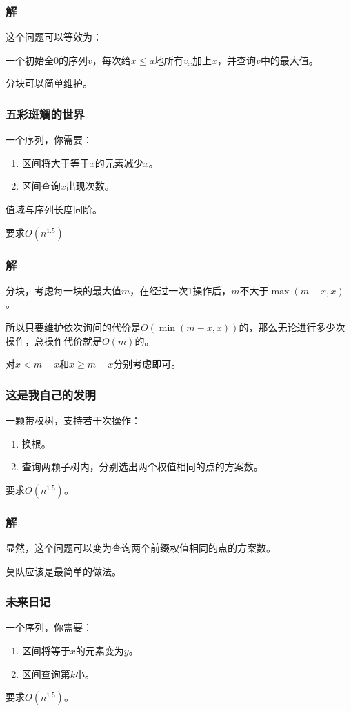 \documentclass[10pt]{beamer}
\begin{document}
	\begin{frame}
		\frametitle{解}
	
		这个问题可以等效为：

		一个初始全$0$的序列$v$，每次给$x\le a$地所有$v_x$加上$x$，并查询$v$中的最大值。

		分块可以简单维护。
	
	\end{frame}
	\begin{frame}
		\frametitle{五彩斑斓的世界}
	
		一个序列，你需要：

		\begin{enumerate}
			\item 区间将大于等于$x$的元素减少$x$。
			\item 区间查询$x$出现次数。
		\end{enumerate}

		值域与序列长度同阶。

		要求$O(n^{1.5})$
	
	\end{frame}
	\begin{frame}
		\frametitle{解}
	
		分块，考虑每一块的最大值$m$，在经过一次1操作后，$m$不大于$\max(m-x,x)$。
	
		所以只要维护依次询问的代价是$O(\min(m-x,x))$的，那么无论进行多少次操作，总操作代价就是$O(m)$的。

		对$x<m-x$和$x\ge m-x$分别考虑即可。

	\end{frame}
	\begin{frame}
		\frametitle{这是我自己的发明}
	
		一颗带权树，支持若干次操作：

		\begin{enumerate}
			\item 换根。
			\item 查询两颗子树内，分别选出两个权值相同的点的方案数。
		\end{enumerate}

		要求$O(n^{1.5})$。
	
	\end{frame}
	\begin{frame}
		\frametitle{解}
	
		显然，这个问题可以变为查询两个前缀权值相同的点的方案数。

		莫队应该是最简单的做法。
		
	\end{frame}
	\begin{frame}
		\frametitle{未来日记}
	
		一个序列，你需要：

		\begin{enumerate}
			\item 区间将等于$x$的元素变为$y$。
			\item 区间查询第$k$小。
		\end{enumerate}

		要求$O(n^{1.5})$。
	
	\end{frame}
\end{document}
